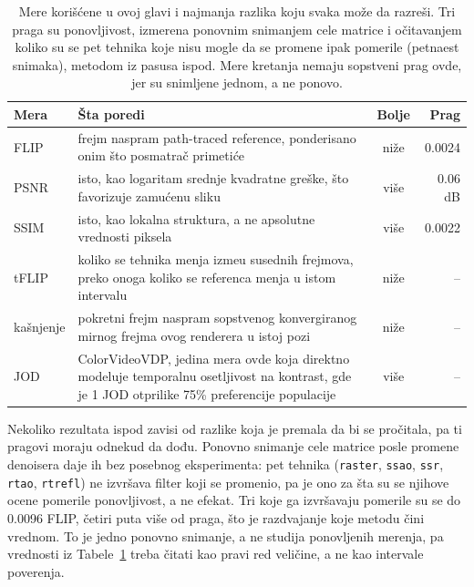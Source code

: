 \begin{table}[tbp]
\caption[Mere kori\v{s}\'cene u ovoj glavi]{Mere kori\v{s}\'cene u ovoj glavi i najmanja
razlika koju svaka mo\v{z}e da razre\v{s}i. Tri praga su ponovljivost, izmerena ponovnim snimanjem cele
matrice i o\v{c}itavanjem koliko su se pet tehnika koje nisu mogle da se promene ipak pomerile
(petnaest snimaka), metodom iz pasusa ispod. Mere kretanja nemaju sopstveni prag
ovde, jer su snimljene jednom, a ne ponovo.}
\label{tab:metrics}
\centering
\small
\begin{tabularx}{\textwidth}{@{}l>{\raggedright\arraybackslash}X c r@{}}
\toprule
Mera & \v{S}ta poredi & Bolje & Prag \\
\midrule
FLIP  & frejm naspram path-traced reference, ponderisano onim \v{s}to posmatra\v{c} primeti\'ce & ni\v{z}e & 0.0024 \\
PSNR  & isto, kao logaritam srednje kvadratne gre\v{s}ke, \v{s}to favorizuje zamu\'cenu sliku & vi\v{s}e & 0.06 dB \\
SSIM  & isto, kao lokalna struktura, a ne apsolutne vrednosti piksela & vi\v{s}e & 0.0022 \\
\addlinespace[3pt]
tFLIP & koliko se tehnika menja izme\dj{}u susednih frejmova, preko onoga koliko se referenca menja u istom intervalu & ni\v{z}e & -- \\
kašnjenje & pokretni frejm naspram sopstvenog konvergiranog mirnog frejma ovog renderera u istoj pozi & ni\v{z}e & -- \\
JOD   & ColorVideoVDP, jedina mera ovde koja direktno modeluje temporalnu osetljivost na kontrast, gde je 1 JOD otprilike 75\% preferencije populacije & vi\v{s}e & -- \\
\bottomrule
\end{tabularx}
\end{table}

Nekoliko rezultata ispod zavisi od razlike koja je premala da bi se pro\v{c}itala, pa ti pragovi moraju
odnekud da dođu. Ponovno snimanje cele matrice posle promene denoisera daje ih bez posebnog
eksperimenta: pet tehnika (\texttt{raster}, \texttt{ssao}, \texttt{ssr}, \texttt{rtao},
\texttt{rtrefl}) ne izvr\v{s}ava filter koji se promenio, pa je ono za \v{s}ta su se njihove ocene pomerile
ponovljivost, a ne efekat. Tri koje ga izvr\v{s}avaju pomerile su se do 0.0096 FLIP, \v{c}etiri puta vi\v{s}e od
praga, \v{s}to je razdvajanje koje metodu \v{c}ini vrednom. To je jedno ponovno snimanje, a ne
studija ponovljenih merenja, pa vrednosti iz Tabele~\ref{tab:metrics} treba \v{c}itati kao pravi red
veli\v{c}ine, a ne kao intervale poverenja.

